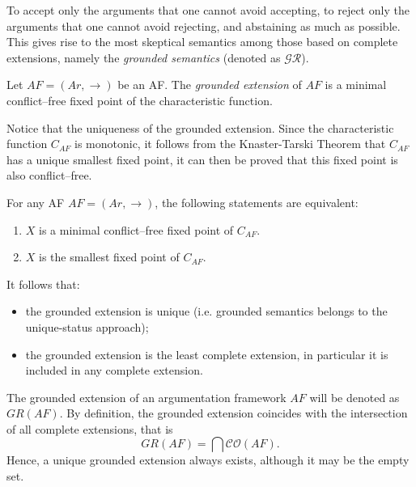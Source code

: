 
To accept only the arguments that one cannot avoid accepting, 
to reject only the arguments that one cannot avoid rejecting, 
and abstaining as much as possible.
% 
This gives rise to the most skeptical semantics among those based on complete extensions, 
namely the 
\textit{grounded semantics} (denoted as $\mathcal{GR}$).




\begin{df}
    Let $AF=(Ar,\to)$ be an AF.
    The \textit{grounded extension} of $AF$ is a minimal conflict--free fixed point of the characteristic function.
\end{df}


Notice that the uniqueness of the grounded extension. 
Since the characteristic function $C_{AF}$ is monotonic, 
it follows from the Knaster-Tarski Theorem that $C_{AF}$ has a unique smallest fixed point, 
it can then be proved that this fixed point is also conflict--free.



\begin{prop}
    For any AF $AF=(Ar,\to)$, 
    the following statements are equivalent:
    \begin{enumerate}[itemsep=5pt,parsep=5pt,leftmargin=3em,topsep=5pt,label=(\arabic*)] 
        \item $X$ is a minimal conflict--free fixed point of $C_{AF}$.
        
        \item $X$ is the smallest fixed point of $C_{AF}$.
    \end{enumerate} 
\end{prop}



It follows that:
\begin{itemize}[itemsep=5pt,parsep=5pt,leftmargin=3em,topsep=5pt]
    \item the grounded extension is unique 
    (i.e. grounded semantics belongs to the unique-status approach);


    \item the grounded extension is the least complete extension, 
    in particular it is included in any complete extension.
\end{itemize}




The grounded extension of an argumentation framework $AF$ will be denoted as $GR(AF)$.
% 
By definition,
the grounded extension coincides with the intersection of all complete extensions, 
that is 
\[
    GR(AF) = \bigcap \mathcal{CO} (AF).
\]
Hence, 
a unique grounded extension always exists, 
although it may be the empty set. 
% 



